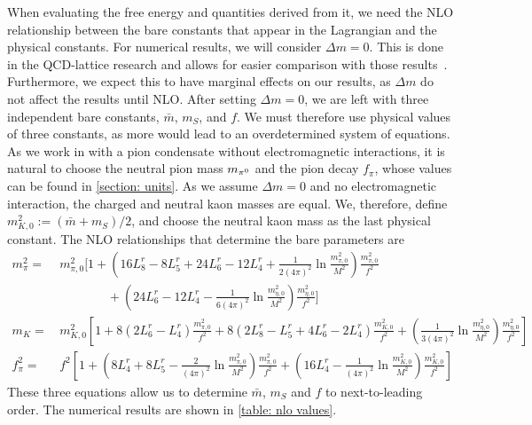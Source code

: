  When evaluating the free energy and quantities derived from it, we need the NLO relationship between the bare constants that appear in the Lagrangian and the physical constants.
For numerical results, we will consider $\Delta m = 0$.
This is done in the QCD-lattice research and allows for easier comparison with those results~\autocite{brandtNewClassCompact2018}.
Furthermore, we expect this to have marginal effects on our results, as $\Delta m$ do not affect the results until NLO.
After setting $\Delta m = 0$, we are left with three independent bare constants, $\bar m$, $m_S$, and $f$.
We must therefore use physical values of three constants, as more would lead to an overdetermined system of equations.
As we work in with a pion condensate without electromagnetic interactions, it is natural to choose the neutral pion mass $m_{\pi^0}$ and the pion decay $f_\pi$, whose values can be found in \autoref{section: units}.
As we assume $\Delta m = 0$ and no electromagnetic interaction, the charged and neutral kaon masses are equal. 
We, therefore, define $m_{K,0}^2 := (\bar m + m_S)/2$, and choose the neutral kaon mass as the last physical constant.
The NLO relationships that determine the bare parameters are~\autocite{gasserChiralPerturbationTheory1985}
%
\begin{align}
    \nonumber
    m_\pi^2 
    =&\, 
    m_{\pi,0}^2
    \Bigg[
        1
        +
        \left(
            16L_8^r - 8L_5^r + 24L_6^r - 12L_4^r
            +
            \frac{1}{2(4\pi)^2}
            \ln\frac{m_{\pi,0}^2}{M^2}
        \right)\frac{m_{\pi,0}^2}{f^2}\\ 
        & \quad \quad \quad \quad
        +
        \left(
            24L_6^r - 12L_4^r
            -
            \frac{1}{6(4\pi)^2}
            \ln\frac{m_{\eta,0}^2}{M^2}
        \right)\frac{m_{\eta,0}^2}{f^2}
    \Bigg] \\
    m_{K}
    =&\,
    m_{K,0}^2
    \left[
        1
        + 8\left(2L_6^r - L_4^r\right) \frac{m_{\pi,0}^2}{f^2}
        + 8\left(2L_8^r - L_5^r + 4L_6^r- 2L_4^r\right) \frac{m_{K,0}^2}{f^2}
        +
        \left(        
            \frac{1}{3(4 \pi)^2} 
            \ln\frac{m_{\eta,0}^2}{M^2}
        \right)
        \frac{m_{\eta,0}^2}{f^2}
    \right]\\
    f_\pi^2
    =&\, f^2
    \left[
        1
        + 
        \left(
            8 L_4^r + 8 L_5^r - \frac{2}{(4\pi)^2} \ln\frac{m_{\pi,0}^2}{M^2}
        \right) \frac{m_{\pi,0}^2}{f^2}
        +
        \left(
            16 L_4^r
            - \frac{1}{(4\pi)^2} \ln\frac {m_{K,0}^2}{M^2}
        \right) \frac{m_{K,0}^2}{f^2}
    \right]
\end{align}
%
These three equations allow us to determine $\bar m$, $m_S$ and $f$ to next-to-leading order.
The numerical results are shown in \autoref{table: nlo values}.

